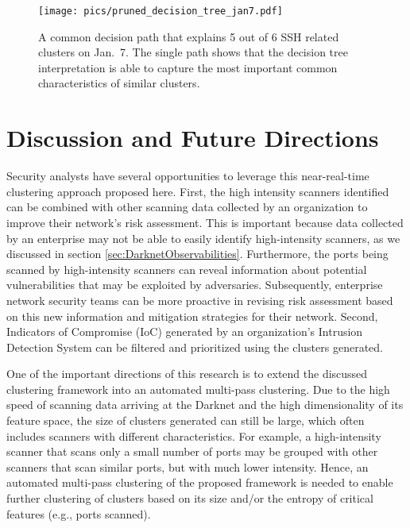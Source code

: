 \documentclass[manuscript, nonacm]{acmart}
\begin{document}
\begin{figure}[ht]
    \centering
    \texttt{[image: pics/pruned\_decision\_tree\_jan7.pdf]}
    \caption{A common decision path that explains 5 out of 6 SSH related clusters on Jan.\ 7. The single path shows that the decision tree interpretation is able to capture the most important common characteristics of similar clusters. }
    \label{fig:cd26}
\end{figure}



\section{Discussion and Future Directions}
\label{future}


Security analysts have several opportunities to
leverage this near-real-time clustering approach proposed here. 
First, the high
intensity scanners identified can be 
combined with other scanning data collected by an organization
to improve their network's risk assessment.
This is important because data collected by an
enterprise may not be able to easily identify 
high-intensity scanners, as we discussed in section
\ref{sec:DarknetObservabilities}.  Furthermore,
the ports being scanned by high-intensity scanners
can reveal information about potential vulnerabilities
that may be exploited by adversaries.  Subsequently,
enterprise network security teams can be more proactive
in revising risk assessment based on this new information
and mitigation strategies
for their network.
Second, Indicators of Compromise (IoC) generated by an
organization's Intrusion Detection System can
be filtered and prioritized using the clusters 
generated.  

One of the important directions of this research
is to extend the discussed clustering framework into
an automated multi-pass clustering.  Due to the
high speed of scanning data arriving at the Darknet
and the 
high dimensionality of its feature space, the size
of clusters generated can still be large, which 
often includes scanners 
with different characteristics. For example, a
high-intensity scanner that scans only a small number
of ports may be grouped with other scanners 
that scan similar ports, but with much lower
intensity.  Hence, an automated multi-pass clustering
of the proposed framework is needed to enable 
further clustering of clusters based on its size
and/or the entropy of critical features (e.g., ports scanned). 
\end{document}
